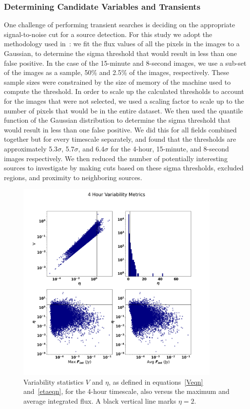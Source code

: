 \documentclass[12pt]{article}
\begin{document}
\subsubsection{Determining Candidate Variables and Transients}
\label{sec:determinecand}
One challenge of performing transient searches is deciding on the appropriate signal-to-noise cut for a source detection. For this study we adopt the methodology used in~\citet{2022MNRAS.517.2894R}: we fit the flux values of all the pixels in the images to a Gaussian, to determine the sigma threshold that would result in less than one false positive. In the case of the 15-minute and 8-second images, we use a sub-set of the images as a sample, 50\% and 2.5\% of the images, respectively. These sample sizes were constrained by the size of memory of the machine used to compute the threshold. In order to scale up the calculated thresholds to account for the images that were not selected, we used a scaling factor to scale up to the number of pixels that would be in the entire dataset. We then used the quantile function of the Gaussian distribution to determine the sigma threshold that would result in less than one false positive. We did this for all fields combined together but for every timescale separately, and found that the thresholds are approximately 5.3$\sigma$, 5.7$\sigma$, and 6.4$\sigma$ for the 4-hour, 15-minute, and 8-second images respectively. We then reduced the number of potentially interesting sources to investigate by making cuts based on these sigma thresholds, excluded regions, and proximity to neighboring sources.
\begin{figure}
	\includegraphics[width=0.9\textwidth]{4_Hour_Variability_Metrics.png}
	\caption{Variability statistics $V$ and $\eta$, as defined in equations~\ref{Veqn} and~\ref{etaeqn}, for the 4-hour timescale, also versus the maximum and average integrated flux. A black vertical line marks $\eta=2$.}
	\label{fig:varstat4hr}
\end{figure}
\end{document}
